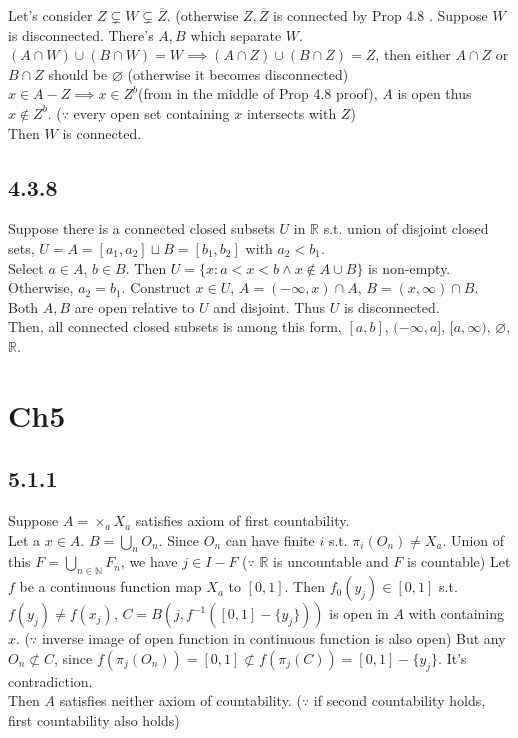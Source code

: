 \documentclass{article}
\let\emptyset\varnothing
\begin{document}
Let's consider $Z \subsetneq W \subsetneq \overline{Z}$. (otherwise $Z, \overline{Z}$ is connected by Prop 4.8 . Suppose $W$ is disconnected. There's $A, B$ which separate $W$.\\
$(A\cap W) \cup(B\cap W) = W \implies (A\cap Z) \cup(B\cap Z) = Z$, then either $A\cap Z$ or $B \cap Z$ should be $\emptyset$ (otherwise it becomes disconnected)\\
$x\in A-Z \implies x\in Z^b$(from in the middle of Prop 4.8 proof), $A$ is open thus $x \notin Z^b$. ($\because$ every open set containing $x$ intersects with $Z$)\\
Then $W$ is connected.

\subsection*{4.3.8}

Suppose there is a connected closed subsets $U$ in $\mathbb{R}$ s.t. union of disjoint closed sets, $U=A=[a_1,a_2]\sqcup B=[b_1,b_2]$ with $a_2 < b_1$.\\
Select $a\in A$, $b\in B$. Then $U=\{x:a<x<b \wedge x \notin A\cup B \}$ is non-empty. Otherwise, $a_2=b_1$. Construct $x \in U$, $A=(-\infty, x)\cap A$, $B=(x, \infty)\cap B$. Both $A, B$ are open relative to $U$ and disjoint. Thus $U$ is disconnected.\\
Then, all connected closed subsets is among this form, $[a,b]$, $(-\infty, a]$, $[a,\infty)$, $\emptyset$, $\mathbb{R}$.

\section*{Ch5}

\subsection*{5.1.1}

Suppose $A=\times_a X_a$ satisfies axiom of first countability.\\
Let a $x \in A$. $B=\bigcup_{n} O_n$. Since $O_n$ can have finite $i$ s.t. $\pi_i(O_n)\neq X_a$. Union of this $F=\bigcup_{n\in \mathbb{N}} F_n$, we have $j\in I-F$ ($\because$ $\mathbb{R}$ is uncountable and $F$ is countable) Let $f$ be a continuous function map $X_a$ to $[0,1]$. Then $f_0(y_j)\in [0,1]$ s.t. $f(y_j) \neq f(x_j)$, $C=B(j, f^{-1}([0,1]-\{y_j\}))$ is open in $A$ with containing $x$. ($\because$ inverse image of open function in continuous function is also open) But any $O_n \not\subset C$, since $f(\pi_j(O_n))=[0,1] \not\subset f(\pi_j(C))=[0,1]-\{y_j\}$. It's contradiction.\\
Then $A$ satisfies neither axiom of countability. ($\because$ if second countability holds, first countability also holds)
\end{document}
